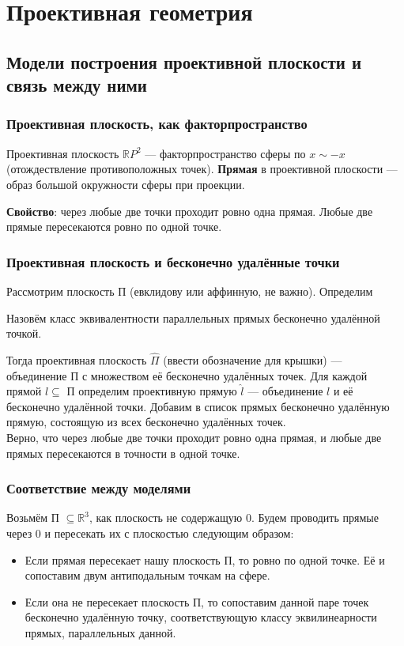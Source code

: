 \documentclass[11pt]{article}
\begin{document}
    \section{Проективная геометрия}
    \subsection{Модели построения проективной плоскости и связь между ними}
    \subsubsection*{Проективная плоскость, как факторпространство}
    \begin{definition}
        Проективная плоскость $\mathbb{R}P^2$ --- факторпространство сферы по $x \sim -x$ (отождествление противоположных точек). \textbf{Прямая} в проективной плоскости --- образ большой окружности сферы при проекции.
    \end{definition}

    \textbf{Свойство}: через любые две точки проходит ровно одна прямая. Любые две прямые пересекаются ровно по одной точке.

    \subsubsection*{Проективная плоскость и бесконечно удалённые точки}

    Рассмотрим плоскость П (евклидову или аффинную, не важно). Определим
    \begin{definition}
        Назовём класс эквивалентности параллельных прямых бесконечно удалённой точкой.
    \end{definition}
    Тогда проективная плоскость $\hat{\Pi}$ (ввести обозначение для крышки) --- объединение П с множеством её бесконечно удалённых точек. Для каждой прямой $l \subseteq$ П определим проективную прямую $\hat{l}$ --- объединение $l$ и её бесконечно удалённой точки. Добавим в список прямых бесконечно удалённую прямую, состоящую из всех бесконечно удалённых точек.\\
    Верно, что через любые две точки проходит ровно одна прямая, и любые две прямых пересекаются в точности в одной точке.

    \subsubsection*{Соответствие между моделями}

    Возьмём П $\subseteq \mathbb{R}^3$, как плоскость не содержащую $0$. Будем проводить прямые через $0$ и пересекать их с плоскостью следующим образом:
    \begin{itemize}
        \item Если прямая пересекает нашу плоскость П, то ровно по одной точке. Её и сопоставим двум антиподальным точкам на сфере.
        \item Если она не пересекает плоскость П, то сопоставим данной паре точек бесконечно удалённую точку, соответствующую классу эквилинеарности прямых, параллельных данной.
    \end{itemize}
\end{document}
